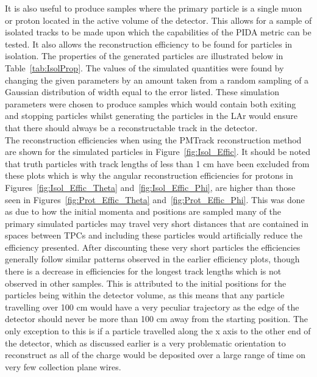 It is also useful to produce samples where the primary particle is a single muon or proton located in the active volume of the detector. This allows for a sample of isolated tracks to be made upon which the capabilities of the PIDA metric can be tested. It also allows the reconstruction efficiency to be found for particles in isolation. The properties of the generated particles are illustrated below in Table~\ref{tab:IsolProp}. The values of the simulated quantities were found by changing the given parameters by an amount taken from a random sampling of a Gaussian distribution of width equal to the error listed. These simulation parameters were chosen to produce samples which would contain both exiting and stopping particles whilst generating the particles in the LAr would ensure that there should always be a reconstructable track in the detector. \\

The reconstruction efficiencies when using the PMTrack reconstruction method are shown for the simulated particles in Figure~\ref{fig:Isol_Effic}. It should be noted that truth particles with track lengths of less than 1 cm have been excluded from these plots which is why the angular reconstruction efficiencies for protons in Figures~\ref{fig:Isol_Effic_Theta} and~\ref{fig:Isol_Effic_Phi}, are higher than those seen in Figures~\ref{fig:Prot_Effic_Theta} and~\ref{fig:Prot_Effic_Phi}. This was done as due to how the initial momenta and positions are sampled many of the primary simulated particles may travel very short distances that are contained in spaces between TPCs and including these particles would artificially reduce the efficiency presented. After discounting these very short particles the efficiencies generally follow similar patterns observed in the earlier efficiency plots, though there is a decrease in efficiencies for the longest track lengths which is not observed in other samples. This is attributed to the initial positions for the particles being within the detector volume, as this means that any particle travelling over 100 cm would have a very peculiar trajectory as the edge of the detector should never be more than 100 cm away from the starting position. The only exception to this is if a particle travelled along the x axis to the other end of the detector, which as discussed earlier is a very problematic orientation to reconstruct as all of the charge would be deposited over a large range of time on very few collection plane wires. \\

